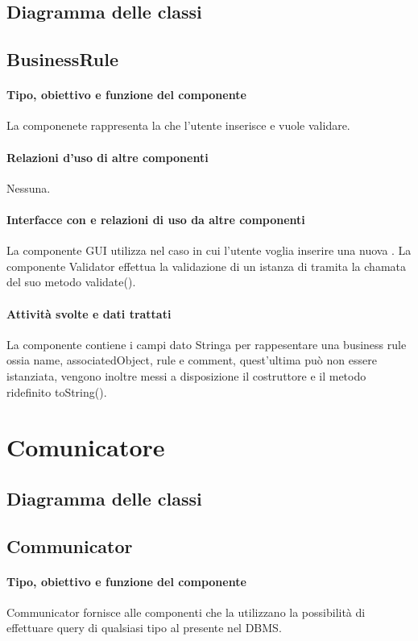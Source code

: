 \documentclass[11pt,titlepage,a4paper]{report}
\begin{document}
\subsection{Diagramma delle classi}
\subsection{BusinessRule}
\paragraph{Tipo, obiettivo e funzione del componente}
La componenete \BR rappresenta la \br che l'utente inserisce e vuole validare.
\paragraph{Relazioni d'uso di altre componenti}
Nessuna.
\paragraph{Interfacce con e relazioni di uso da altre componenti}
La componente GUI utilizza \BR nel caso in cui l'utente voglia inserire una nuova \br.
La componente Validator effettua la validazione di un istanza di \BR tramita la chamata del suo metodo validate().
\paragraph{Attivit\`a svolte e dati trattati}
La componente contiene i campi dato Stringa per rappesentare una business rule ossia name, associatedObject, rule e comment, quest'ultima può non essere istanziata, vengono inoltre messi a disposizione il costruttore e il metodo ridefinito toString().

\section{Comunicatore}
\subsection{Diagramma delle classi}
\subsection{Communicator}
\paragraph{Tipo, obiettivo e funzione del componente}
Communicator fornisce alle componenti che la utilizzano la possibilit\`a di effettuare query di qualsiasi tipo al \re presente nel DBMS.
\end{document}
